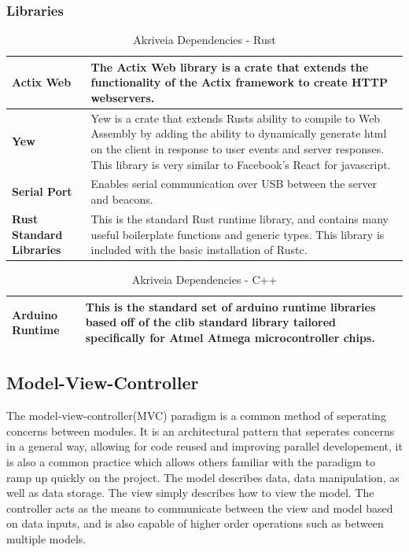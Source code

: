 \subsubsection{Libraries}
\label{software_libraries}

\begin{table}[H]
\centering
\begin{tabular}{ | m{3.25cm} | m{12.5cm} |}
	\hline
	\textbf{Actix Web} & The Actix Web library is a crate that extends the functionality of the Actix framework to create HTTP webservers. \\
	\hline
	\textbf{Yew} & Yew is a crate that extends Rusts ability to compile to Web Assembly by adding the ability to dynamically generate html on the client in response to user events and server responses. This library is very similar to Facebook's React for javascript. \\
	\hline
	\textbf{Serial Port} & Enables serial communication over USB between the server and beacons.\\
	\hline
	\textbf{Rust Standard Libraries} & This is the standard Rust runtime library, and contains many useful boilerplate functions and generic types. This library is included with the basic installation of Rustc. \\
	\hline
\end{tabular}
\caption{Akriveia Dependencies - Rust}
\end{table}

\begin{table}[H]
\centering
\begin{tabular}{ | m{3.25cm} | m{12.5cm} |}
	\hline
	\textbf{Arduino Runtime} & This is the standard set of arduino runtime libraries based off of the clib standard library tailored specifically for Atmel Atmega microcontroller chips. \\
	\hline
\end{tabular}
\caption{Akriveia Dependencies - C++}
\end{table}

\bigskip
\subsection{Model-View-Controller}
The model-view-controller(MVC) paradigm is a common method of seperating concerns between modules.
It is an architectural pattern that seperates concerns in a general way, allowing for code reused and improving parallel developement, it is also a common practice which allows others familiar with the paradigm to ramp up quickly on the project.
The model describes data, data manipulation, as well as data storage.
The view simply describes how to view the model.
The controller acts as the means to communicate between the view and model based on data inputs, and is also capable of higher order operations such as between multiple models.

